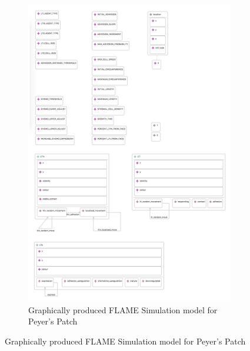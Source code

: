 \documentclass{UoYCSproject}
\begin{document}
\begin{figure}[htp]
\centering
\begin{subfigure}{\textwidth}
\centering
\includegraphics[width=\textwidth]{Appendix/ppsim_gmf}
\caption{Graphically produced FLAME Simulation model for Peyer's Patch}
\label{fig:ppsim_gmf}
\end{subfigure}%
\end{figure}
\end{document}
